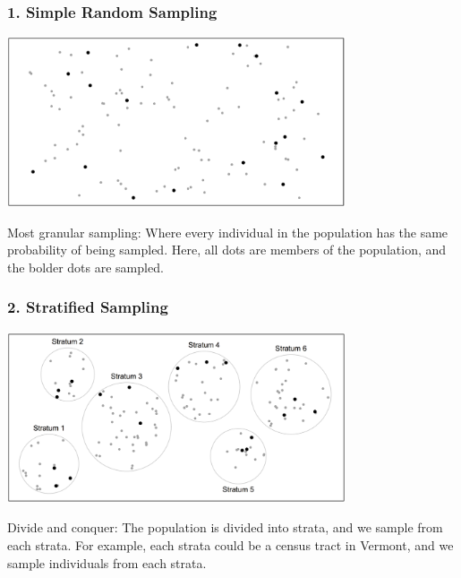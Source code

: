 \documentclass[slides]{beamer}
\newcommand{\blue}[1]{\textcolor{blue2}{#1}}
\begin{document}
\begin{frame}
\frametitle{1. Simple Random Sampling}

%
%
\begin{center}
\includegraphics[width=0.75\textwidth]{figure/simple.png}
\end{center}


\blue{Most granular sampling}:  Where every individual in the population has the same probability of being sampled.  Here, all dots are members of the population, and the bolder dots are sampled.  
\end{frame}


\begin{frame}[fragile]
\frametitle{2. Stratified Sampling}

%
%
\begin{center}
\includegraphics[width=0.75\textwidth]{figure/stratified.png}
\end{center}

\blue{Divide and conquer}:  The population is divided into strata, and we sample from each strata.  For example, each strata could be a census tract in Vermont, and we sample individuals from each strata.  

\end{frame}
\end{document}
